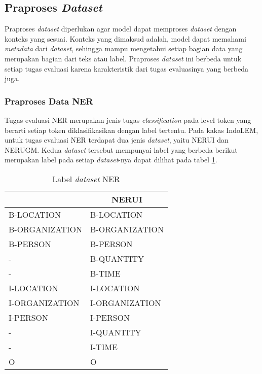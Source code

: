\subsection{Praproses \textit{Dataset}}
\label{sec:praproses}

Praproses \textit{dataset} diperlukan agar model dapat memproses \textit{dataset} dengan konteks yang sesuai. Konteks yang dimaksud adalah, model dapat memahami \textit{metadata} dari \textit{dataset}, sehingga mampu mengetahui setiap bagian data yang merupakan bagian dari teks atau label. Praproses \textit{dataset} ini berbeda untuk setiap tugas evaluasi karena karakteristik dari tugas evaluasinya yang berbeda juga.

\subsubsection{Praproses Data NER}

Tugas evaluasi NER merupakan jenis tugas \textit{classification} pada level token yang berarti setiap token  diklasifikasikan dengan label tertentu. Pada kakas IndoLEM, untuk tugas evaluasi NER terdapat dua jenis \textit{dataset}, yaitu NERUI dan NERUGM. Kedua \textit{dataset} tersebut mempunyai label yang berbeda berikut merupakan label pada setiap \textit{dataset}-nya dapat dilihat pada tabel \ref{table:label-ner}.

\begin{table}[h]
    \vspace{0.25cm}
    \caption{Label \textit{dataset} NER}
    \label{table:label-ner}
    \begin{center}
        \begin{tabular}{|l|l|}
            \hline \rowcolor{black!10}
            \multicolumn{1}{|c|}{\textbf{NERUI}} & \multicolumn{1}{|c|}{\textbf{NERUI}} \\ \hline
            B-LOCATION & B-LOCATION \\ \hline
            B-ORGANIZATION & B-ORGANIZATION \\ \hline
            B-PERSON & B-PERSON \\ \hline
            - & B-QUANTITY \\ \hline
            - & B-TIME \\ \hline
            I-LOCATION & I-LOCATION \\ \hline
            I-ORGANIZATION & I-ORGANIZATION \\ \hline
            I-PERSON & I-PERSON \\ \hline
            - & I-QUANTITY \\ \hline
            - & I-TIME \\ \hline
            O & O \\ \hline
        \end{tabular}
    \end{center}
\end{table}

